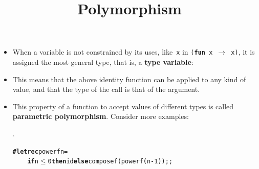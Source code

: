 \documentclass[wide]{slides}
\begin{document}
\begin{slide}
  \title{Polymorphism}

  \begin{itemize}

    \item When a variable is not constrained by its uses,
      like~\texttt{x} in \texttt{(\textbf{fun} x $\rightarrow$ x)}, it
      is assigned the most general type, that is, a \textbf{type
        variable}:\\
      \noindent{}

      \noindent{}

    \item This means that the above identity function can be applied
      to any kind of value, and that the type of the call is that of
      the argument.

    \item This property of a function to accept values of different
      types is called \textbf{parametric polymorphism}. Consider more
      examples:\\
      \noindent{}

      \noindent\topout{\textbf{-} : $\alpha \times \beta \times
        \gamma \rightarrow \alpha$}.

      \noindent{}

      \noindent{}
\begin{alltt}
\textbf{\# let rec} power f n =
\ \ \ \ \textbf{if} n \(\leqslant\) 0 \textbf{then} id \textbf{else} compose f (power f (n-1));;
\end{alltt}
      \noindent{}

  \end{itemize}

\end{slide}
\end{document}
